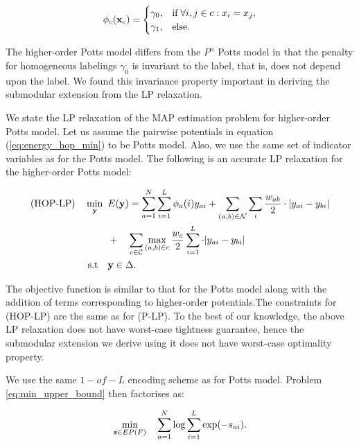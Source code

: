\begin{equation}
  \phi_c({\bf x}_c) = 
  \begin{cases}
    \gamma_0, &{\text{if}} \; \forall i, j \in c: x_i = x_j, \\
    \gamma_1, &{\text{else}}. 
  \end{cases} 
\end{equation}

The higher-order Potts model differs from the $P^n$ Potts model \citep{kohli2007p3} in that the penalty for homogeneous labelings $\gamma_0$ is invariant to the label, that is, does not depend upon the label. We found this invariance property important in deriving the submodular extension from the LP relaxation.

We state the LP relaxation of the MAP estimation problem for higher-order Potts model. Let us assume the pairwise potentials in equation (\ref{eq:energy_hop_min}) to be Potts model. Also, we use the same set of indicator variables as for the Potts model. The following is an accurate LP relaxation for the higher-order Potts model:

\begin{align}
    \text{(HOP-LP)} \quad \min_{\bf y} \enskip & E({\bf y}) =  \sum_{a = 1}^N
    \sum_{i = 1}^L \phi_a(i)y_{ai} + 
    \sum_{(a, b) \in {\mathcal N}} \sum_{i} \frac{w_{ab}}{2} \cdot |y_{ai} - y_{bi}| \nonumber\\
    & + \quad \sum_{c \in {\mathcal C}} \max_{(a, b) \in c} \frac{w_c}{2} \sum_{i = 1}^L \cdot |y_{ai} - y_{bi}| \nonumber\\
    \text{s.t} \quad &{\bf y} \in \Delta.
\label{eq:hop-lp}
\end{align}

The objective function is similar to that for the Potts model along with the addition of terms corresponding to higher-order potentials.The constraints for (HOP-LP) are the same as for (P-LP). To the best of our knowledge, the above LP relaxation does not have worst-case tightness guarantee, hence the submodular extension we derive using it does not have worst-case optimality property.
 
 We use the same $1-of-L$ encoding
scheme as for Potts model. Problem \ref{eq:min_upper_bound} then factorises as: 

\begin{equation}
\min_{{\bf s} \in EP(F)} \quad \sum_{a = 1}^{N} \log \sum_{i = 1}^L \exp(-s_{ai}).
\label{eq:hop_upper_bound}
\end{equation}

